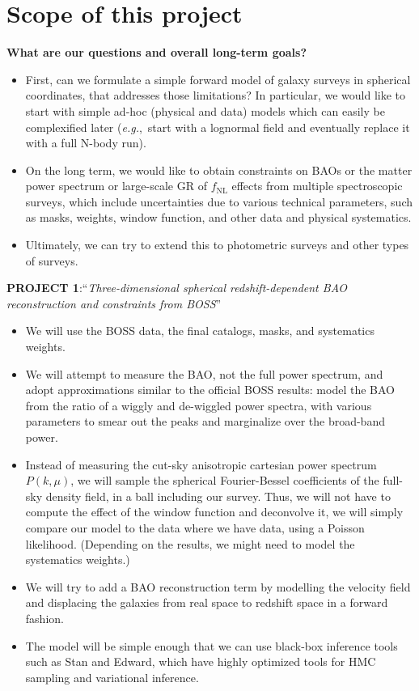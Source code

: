 \documentclass{aastex6}
\newcommand{\eg}{{\textit{e.g.},~}}
\begin{document}
\section{Scope of this project}

\textbf{What are our questions and overall long-term goals?}
\begin{itemize}
\item First, can we formulate a simple forward model of galaxy surveys in spherical coordinates, that addresses those limitations? In particular, we would like to start with simple ad-hoc (physical and data) models which can easily be complexified later (\eg start with a lognormal field and eventually replace it with a full N-body run).
\item On the long term, we would like to obtain constraints on BAOs or the matter power spectrum or large-scale GR of $f_{\mathrm{NL}}$ effects from multiple spectroscopic surveys, which include uncertainties due to various technical parameters, such as masks, weights, window function, and other data and physical systematics.
\item Ultimately, we can try to extend this to photometric surveys and other types of surveys.
\end{itemize}

\textbf{PROJECT 1}:``\textit{Three-dimensional spherical redshift-dependent BAO reconstruction and constraints from BOSS}''
\begin{itemize}
\item We will use the BOSS data, the final catalogs, masks, and systematics weights. 
\item We will attempt to measure the BAO, not the full power spectrum, and adopt approximations similar to the official BOSS results: model the BAO from the ratio of a wiggly and de-wiggled power spectra, with various parameters to smear out the peaks and marginalize over the broad-band power.
\item Instead of measuring the cut-sky anisotropic cartesian power spectrum $P(k,\mu)$, we will sample the spherical Fourier-Bessel coefficients of the full-sky  density field, in a ball including our survey. Thus, we will not have to compute the effect of the window function and deconvolve it, we will simply compare our model to the data where we have data, using a Poisson likelihood. (Depending on the results, we might need to model the systematics weights.)
\item We will try to add a BAO reconstruction term by modelling the velocity field and displacing the galaxies from real space to redshift space in a forward fashion.
\item The model will be simple enough that we can use black-box inference tools such as Stan and Edward, which have highly optimized tools for HMC sampling and variational inference.
\end{itemize}
\end{document}
